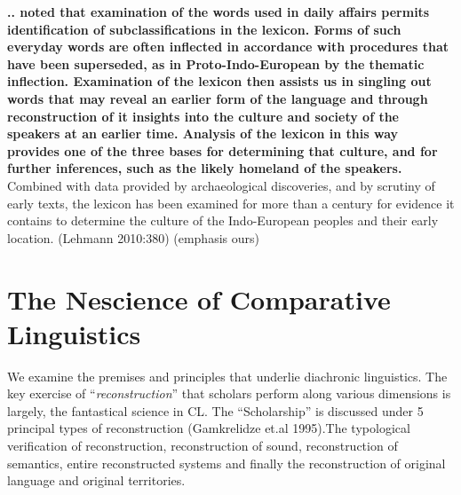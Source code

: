 \begin{myquote}
\textbf{.. noted that examination of the words used in daily affairs permits identification of subclassifications in the lexicon. Forms of such everyday words are often inflected in accordance with procedures that have been superseded, as in Proto-Indo-European by the thematic inflection. Examination of the lexicon then assists us in singling out words that may reveal an earlier form of the language and through reconstruction of it insights into the culture and society of the speakers at an earlier time. Analysis of the lexicon in this way provides one of the three bases for determining that culture, and for further inferences, such as the likely homeland of the speakers.} Combined with data provided by archaeological discoveries, and by scrutiny of early texts, the lexicon has been examined for more than a century for evidence it contains to determine the culture of the Indo-European peoples and their early location. (Lehmann 2010:380) (emphasis ours)
\end{myquote}


\section*{The Nescience of Comparative Linguistics}

We examine the premises and principles that underlie diachronic linguistics. The key exercise of “\textit{reconstruction}” that scholars perform along various dimensions is largely, the fantastical science in CL. The “Scholarship” is discussed under 5 principal types of reconstruction (Gamkrelidze et.al 1995).The typological verification of reconstruction, reconstruction of sound, reconstruction of semantics, entire reconstructed systems and finally the reconstruction of original language and original territories.

